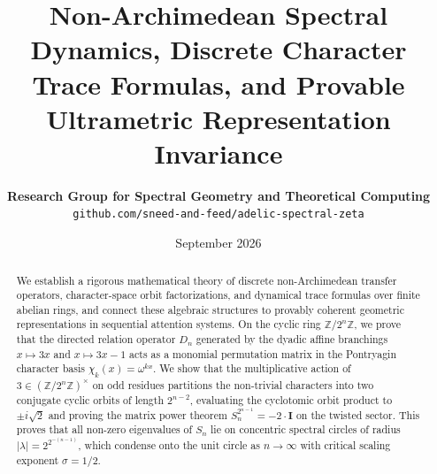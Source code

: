 \documentclass[11pt,reqno]{article}
\title{\textbf{Non-Archimedean Spectral Dynamics, Discrete Character Trace Formulas, and Provable Ultrametric Representation Invariance}}
\author{
  \textbf{Research Group for Spectral Geometry and Theoretical Computing} \\
  \texttt{github.com/sneed-and-feed/adelic-spectral-zeta}
}
\date{September 2026}
\theoremstyle{plain}
\theoremstyle{definition}
\theoremstyle{remark}
\newcommand{\Z}{\mathbb{Z}}
\begin{document}
\maketitle

\begin{abstract}
We establish a rigorous mathematical theory of discrete non-Archimedean transfer operators, character-space orbit factorizations, and dynamical trace formulas over finite abelian rings, and connect these algebraic structures to provably coherent geometric representations in sequential attention systems. On the cyclic ring $\Z/2^n\Z$, we prove that the directed relation operator $D_n$ generated by the dyadic affine branchings $x \mapsto 3x$ and $x \mapsto 3x - 1$ acts as a monomial permutation matrix in the Pontryagin character basis $\chi_k(x) = \omega^{kx}$. We show that the multiplicative action of $3 \in (\Z/2^n\Z)^\times$ on odd residues partitions the non-trivial characters into two conjugate cyclic orbits of length $2^{n-2}$, evaluating the cyclotomic orbit product to $\pm i \sqrt{2}$ and proving the matrix power theorem $S_n^{2^{n-1}} = -2 \cdot \mathbf{I}$ on the twisted sector. This proves that all non-zero eigenvalues of $S_n$ lie on concentric spectral circles of radius $|\lambda| = 2^{2^{-(n-1)}}$, which condense onto the unit circle as $n \to \infty$ with critical scaling exponent $\sigma = 1/2$.


\end{abstract}
\end{document}
